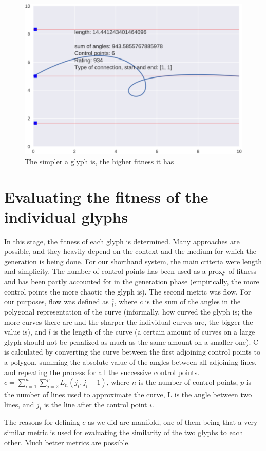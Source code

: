 \documentclass{vgtc}                          %
\begin{document}
\begin{figure}[tbp]
\centering
        \includegraphics[width=0.75\hsize]{e2.pdf}
\caption{The simpler a glyph is, the higher fitness it has}
\end{figure}

\section{Evaluating the fitness of the individual glyphs}
In this stage, the fitness of each glyph is determined. Many approaches are possible, and they heavily depend on the context and the medium for which the generation is being done. For our shorthand system, the main criteria were length and simplicity. The number of control points has been used as a proxy of fitness and has been partly accounted for in the generation phase (empirically, the more control points the more chaotic the glyph is). The second metric was flow. For our purposes,
flow was defined as \(\frac{c}{l}\), where \(c\) is the sum of the angles in the polygonal representation of the curve (informally, how curved the glyph is; the more curves there are and the sharper the individual curves are, the bigger the value is), and \(l\) is the length of the curve (a certain amount of curves on a large glyph should not be penalized as much as the same amount on a smaller one). C is calculated by converting the curve between the first adjoining control points to a polygon, summing the absolute value of the angles between all adjoining lines, and repeating the process for all the successive control points.
\(c=\sum_{i=1}^n\sum_{j=2}^{p}L_n(j_i, j_i-1)\), where \(n\) is the number of control points,  \(p\) is the number of lines used to approximate the curve, L is the angle between two lines,  and \(j_i\) is the line after the control point \(i\). 

The reasons for defining \(c\) as we did are manifold, one of them being that a very similar metric is used for evaluating the similarity of the two glyphs to each other. Much better metrics are possible.
\end{document}
